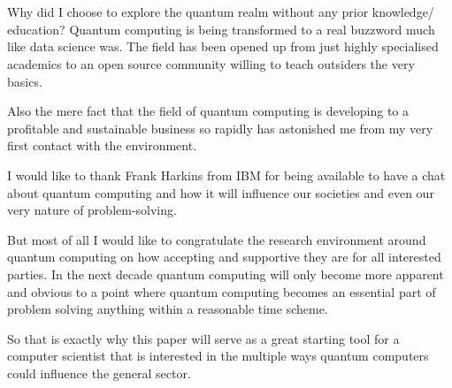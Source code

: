 
\chapter*{}
\label{ch:voorwoord}


Why did I choose to explore the quantum realm without any prior knowledge/ education? Quantum computing is being transformed to a real buzzword much like data science was. The field has been opened up from just highly specialised academics to an open source community willing to teach outsiders the very basics.

Also the mere fact that the field of quantum computing is developing to a profitable and sustainable business so rapidly has astonished me from my very first contact with the environment.

 I would like to thank Frank Harkins from IBM for being available to have a chat about quantum computing and how it will influence our societies and even our very nature of problem-solving. 
 
 But most of all I would like to congratulate the research environment around quantum computing on how accepting and supportive they are for all interested parties. In the next decade quantum computing will only become more apparent and obvious to a point where quantum computing becomes an essential part of problem solving anything within a reasonable time scheme.
 
 So that is exactly why this paper will serve as a great starting tool for a computer scientist that is interested in the multiple ways quantum computers could influence the general sector.
